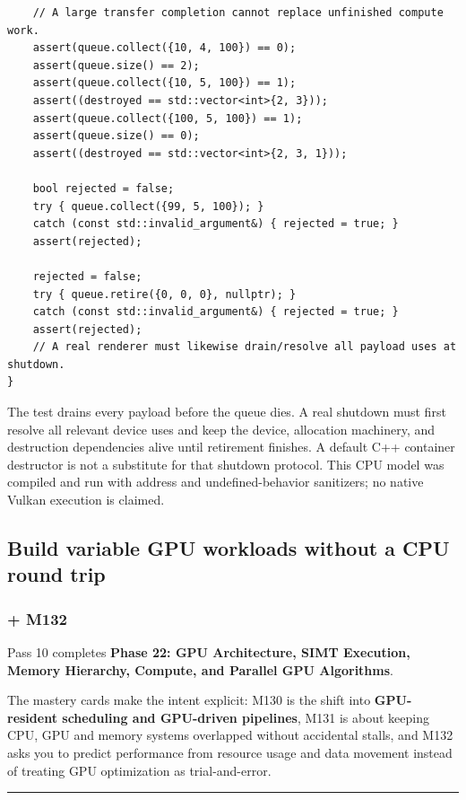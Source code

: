 \begin{verbatim}
    // A large transfer completion cannot replace unfinished compute work.
    assert(queue.collect({10, 4, 100}) == 0);
    assert(queue.size() == 2);
    assert(queue.collect({10, 5, 100}) == 1);
    assert((destroyed == std::vector<int>{2, 3}));
    assert(queue.collect({100, 5, 100}) == 1);
    assert(queue.size() == 0);
    assert((destroyed == std::vector<int>{2, 3, 1}));

    bool rejected = false;
    try { queue.collect({99, 5, 100}); }
    catch (const std::invalid_argument&) { rejected = true; }
    assert(rejected);

    rejected = false;
    try { queue.retire({0, 0, 0}, nullptr); }
    catch (const std::invalid_argument&) { rejected = true; }
    assert(rejected);
    // A real renderer must likewise drain/resolve all payload uses at shutdown.
}
\end{verbatim}

The test drains every payload before the queue dies. A real shutdown must first resolve all relevant device uses and keep the device, allocation machinery, and destruction dependencies alive until retirement finishes. A default C++ container destructor is not a substitute for that shutdown protocol. This CPU model was compiled and run with address and undefined-behavior sanitizers; no native Vulkan execution is claimed.

\subsection{Build variable GPU workloads without a CPU round trip}\label{05-engine-i-ch019-build-variable-gpu-workloads-without-a-cpu-round-trip}

\subsubsection{+ M132}\label{05-engine-i-ch019-m132}

Pass 10 completes \textbf{Phase 22: GPU Architecture, SIMT Execution, Memory Hierarchy, Compute, and Parallel GPU Algorithms}.

The mastery cards make the intent explicit: M130 is the shift into \textbf{GPU-resident scheduling and GPU-driven pipelines}, M131 is about keeping CPU, GPU and memory systems overlapped without accidental stalls, and M132 asks you to predict performance from resource usage and data movement instead of treating GPU optimization as trial-and-error.

\begin{center}\rule{0.5\linewidth}{0.5pt}\end{center}

